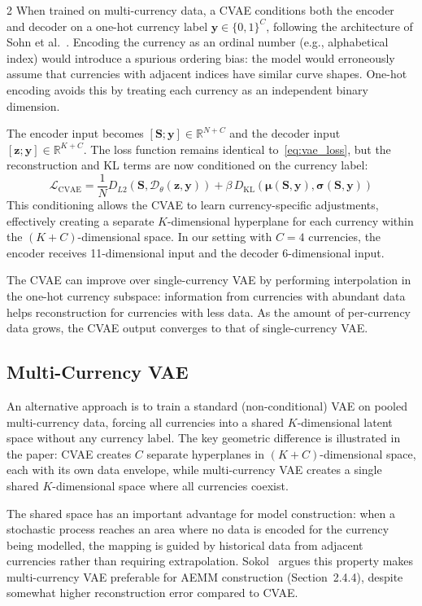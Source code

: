 \documentclass[10pt,a4paper]{article}
\theoremstyle{plain}
\theoremstyle{definition}
\begin{document}
\begin{multicols}{2}
When trained on multi-currency data, a CVAE conditions both the encoder and decoder on a one-hot currency label $\mathbf{y} \in \{0,1\}^C$, following the architecture of Sohn et al.~\cite{sohn2015}. Encoding the currency as an ordinal number (e.g., alphabetical index) would introduce a spurious ordering bias: the model would erroneously assume that currencies with adjacent indices have similar curve shapes. One-hot encoding avoids this by treating each currency as an independent binary dimension.

The encoder input becomes $[\mathbf{S}; \mathbf{y}] \in \mathbb{R}^{N+C}$ and the decoder input $[\mathbf{z}; \mathbf{y}] \in \mathbb{R}^{K+C}$. The loss function remains identical to~\cref{eq:vae_loss}, but the reconstruction and KL terms are now conditioned on the currency label:
\begin{equation}\label{eq:cvae_loss}
\mathcal{L}_{\text{CVAE}} = \frac{1}{N}D_{L2}(\mathbf{S}, \mathcal{D}_\theta(\mathbf{z}, \mathbf{y})) + \beta\, D_{\mathrm{KL}}(\boldsymbol{\mu}(\mathbf{S},\mathbf{y}), \boldsymbol{\sigma}(\mathbf{S},\mathbf{y}))
\end{equation}
This conditioning allows the CVAE to learn currency-specific adjustments, effectively creating a separate $K$-dimensional hyperplane for each currency within the $(K+C)$-dimensional space. In our setting with $C=4$ currencies, the encoder receives 11-dimensional input and the decoder 6-dimensional input.

The CVAE can improve over single-currency VAE by performing interpolation in the one-hot currency subspace: information from currencies with abundant data helps reconstruction for currencies with less data. As the amount of per-currency data grows, the CVAE output converges to that of single-currency VAE.

\subsection{Multi-Currency VAE}

An alternative approach is to train a standard (non-conditional) VAE on pooled multi-currency data, forcing all currencies into a shared $K$-dimensional latent space without any currency label. The key geometric difference is illustrated in the paper: CVAE creates $C$ separate hyperplanes in $(K+C)$-dimensional space, each with its own data envelope, while multi-currency VAE creates a single shared $K$-dimensional space where all currencies coexist.

The shared space has an important advantage for model construction: when a stochastic process reaches an area where no data is encoded for the currency being modelled, the mapping is guided by historical data from adjacent currencies rather than requiring extrapolation. Sokol~\cite{sokol2022} argues this property makes multi-currency VAE preferable for AEMM construction (Section~2.4.4), despite somewhat higher reconstruction error compared to CVAE.


\end{multicols}
\end{document}
